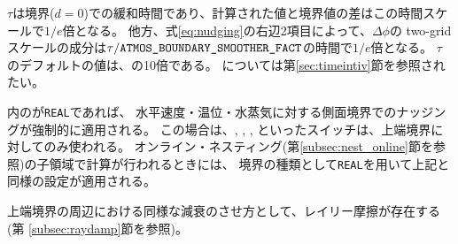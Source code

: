 $\tau$は境界($d=0$)での緩和時間であり、計算された値と境界値の差はこの時間スケールで$1/e$倍となる。
他方、式\ref{eq:nudging}の右辺2項目によって、$\Delta \phi$の two-grid スケールの成分は$\tau/\nmitemeq{ATMOS_BOUNDARY_SMOOTHER_FACT}$の時間で$1/e$倍となる。
$\tau$のデフォルトの値は、の10倍である。
については第\ref{sec:timeintiv}節を参照されたい。


内のが\verb|REAL|であれば、
水平速度・温位・水蒸気に対する側面境界でのナッジングが強制的に適用される。
この場合は、, ,
,  といったスイッチは、上端境界に対してのみ使われる。
オンライン・ネスティング(第\ref{subsec:nest_online}節を参照)の子領域で計算が行われるときには、
境界の種類として\verb|REAL|を用いて上記と同様の設定が適用される。

上端境界の周辺における同様な減衰のさせ方として、レイリー摩擦が存在する(第 \ref{subsec:raydamp}節を参照)。
